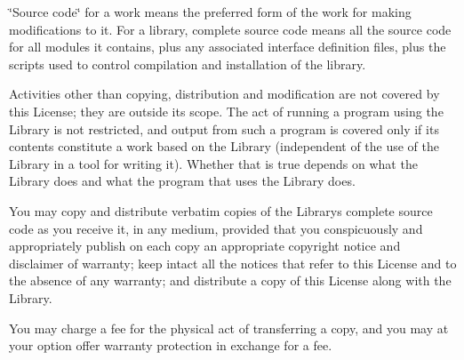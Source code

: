 \char`\"{}\+Source code\char`\"{} for a work means the preferred form of the work for making modifications to it. For a library, complete source code means all the source code for all modules it contains, plus any associated interface definition files, plus the scripts used to control compilation and installation of the library.

Activities other than copying, distribution and modification are not covered by this License; they are outside its scope. The act of running a program using the Library is not restricted, and output from such a program is covered only if its contents constitute a work based on the Library (independent of the use of the Library in a tool for writing it). Whether that is true depends on what the Library does and what the program that uses the Library does.


\begin{DoxyEnumerate}
\item You may copy and distribute verbatim copies of the Library\textquotesingle{}s complete source code as you receive it, in any medium, provided that you conspicuously and appropriately publish on each copy an appropriate copyright notice and disclaimer of warranty; keep intact all the notices that refer to this License and to the absence of any warranty; and distribute a copy of this License along with the Library.
\end{DoxyEnumerate}

You may charge a fee for the physical act of transferring a copy, and you may at your option offer warranty protection in exchange for a fee.


